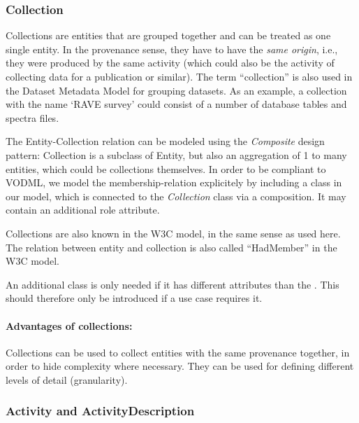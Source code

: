 \subsubsection{Collection}\label{sec:collection}
Collections are entities that are grouped together and can be treated as one single entity. 
In the provenance sense, they have to have the \emph{same origin}, i.e., they were 
produced by the same activity (which could also be the activity of collecting
data for a publication or similar). The term ``collection'' is 
also used in the Dataset Metadata Model for grouping datasets.
As an example, a collection 
with the name `RAVE survey' could consist of a number of database tables and spectra files.


The Entity-Collection relation can be modeled using the \emph{Composite} design pattern: 
Collection is a subclass of Entity, but also an aggregation of 1 to many entities, 
which could be collections themselves. 
In order to be compliant to VODML, we model the membership-relation explicitely 
by including a  class in our model, which is connected to the
\emph{Collection} class via a composition. It may contain an additional role attribute.

Collections are also known in the W3C model, in the same sense as used here.
The relation between entity and collection is also called ``HadMember'' in the W3C model.

An additional class  is only 
needed if it has different attributes than 
the . This should therefore only be introduced if a use case requires it.

\paragraph{Advantages of collections:} Collections can be used to collect entities with the same provenance together, 
    in order to hide complexity where necessary. They can be used for defining 
    different levels of detail (granularity).





\subsubsection{Activity and ActivityDescription}

